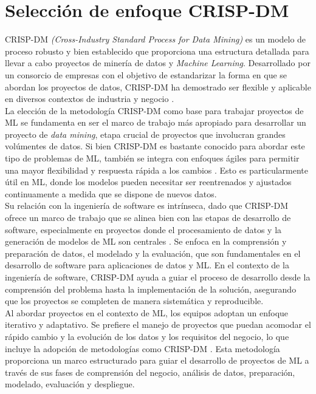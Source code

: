 \documentclass[journal]{IEEEtran}
\begin{document}
\section{Selección de enfoque CRISP-DM}

CRISP-DM \textit{(Cross-Industry Standard Process for Data Mining)} es un modelo de proceso robusto y bien establecido que proporciona una estructura detallada para llevar a cabo proyectos de minería de datos y \textit{Machine Learning}. Desarrollado por un consorcio de empresas con el objetivo de estandarizar la forma en que se abordan los proyectos de datos, CRISP-DM ha demostrado ser flexible y aplicable en diversos contextos de industria y negocio \cite{datasciencepmWhatCRISP}.\\

La elección de la metodología CRISP-DM como base para trabajar proyectos de ML se fundamenta en ser el marco de trabajo más apropiado para desarrollar un proyecto de \textit{data mining}, etapa crucial de proyectos que involucran grandes volúmentes de datos. Si bien CRISP-DM es bastante conocido para abordar este tipo de problemas de ML, también se integra con enfoques ágiles para permitir una mayor flexibilidad y respuesta rápida a los cambios \cite{datasciencepmWhatCRISP}. Esto es particularmente útil en ML, donde los modelos pueden necesitar ser reentrenados y ajustados continuamente a medida que se dispone de nuevos datos.\\

Su relación con la ingeniería de software es intrínseca, dado que CRISP-DM ofrece un marco de trabajo que se alinea bien con las etapas de desarrollo de software, especialmente en proyectos donde el procesamiento de datos y la generación de modelos de ML son centrales \cite{Forward2008}. Se enfoca en la comprensión y preparación de datos, el modelado y la evaluación, que son fundamentales en el desarrollo de software para aplicaciones de datos y ML. En el contexto de la ingeniería de software, CRISP-DM ayuda a guiar el proceso de desarrollo desde la comprensión del problema hasta la implementación de la solución, asegurando que los proyectos se completen de manera sistemática y reproducible.\\

Al abordar proyectos en el contexto de ML, los equipos adoptan un enfoque iterativo y adaptativo. Se prefiere el manejo de proyectos que puedan acomodar el rápido cambio y la evolución de los datos y los requisitos del negocio, lo que incluye la adopción de metodologías como CRISP-DM \cite{datasciencepmWhatCRISP}. Esta metodología proporciona un marco estructurado para guiar el desarrollo de proyectos de ML a través de sus fases de comprensión del negocio, análisis de datos, preparación, modelado, evaluación y despliegue.\\
\end{document}
